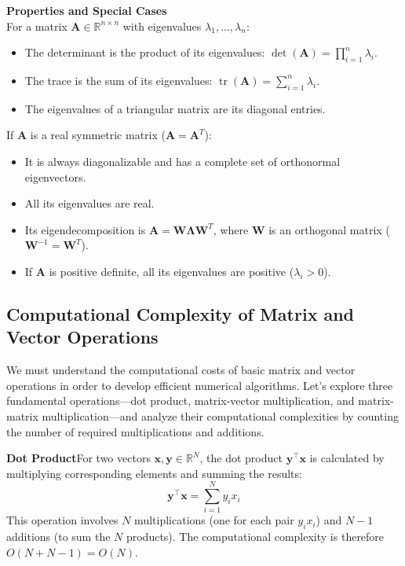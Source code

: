 \begin{theoremBox}
    \textbf{Properties and Special Cases} \\
    For a matrix $\mathbf{A} \in \mathbb{R}^{n \times n}$ with eigenvalues $\lambda_1, \dots, \lambda_n$:
    \begin{itemize}
        \item The determinant is the product of its eigenvalues: $\det(\mathbf{A}) = \prod_{i=1}^n \lambda_i$.
        \item The trace is the sum of its eigenvalues: $\operatorname{tr}(\mathbf{A}) = \sum_{i=1}^n \lambda_i$.
        \item The eigenvalues of a triangular matrix are its diagonal entries.
    \end{itemize}
    If $\mathbf{A}$ is a real symmetric matrix ($\mathbf{A} = \mathbf{A}^T$):
    \begin{itemize}
        \item It is always diagonalizable and has a complete set of orthonormal eigenvectors.
        \item All its eigenvalues are real.
        \item Its eigendecomposition is $\mathbf{A} = \mathbf{W} \mathbf{\Lambda} \mathbf{W}^T$, where $\mathbf{W}$ is an orthogonal matrix ($\mathbf{W}^{-1} = \mathbf{W}^T$).
        \item If $\mathbf{A}$ is positive definite, all its eigenvalues are positive ($\lambda_i > 0$).
    \end{itemize}
\end{theoremBox}


\subsection{Computational Complexity of Matrix and Vector Operations}
\label{sec:complexity-of-matrix-and-vector-operations}
We must understand the computational costs of basic matrix and vector operations in order to develop efficient numerical algorithms. Let's explore three fundamental operations---dot product, matrix-vector multiplication, and matrix-matrix multiplication---and analyze their computational complexities by counting the number of required multiplications and additions.

\textbf{Dot Product}\quad For two vectors $ \mathbf{x}, \mathbf{y} \in \mathbb{R}^N $, the dot product $ \mathbf{y}^\top \mathbf{x} $ is calculated by multiplying corresponding elements and summing the results:
\begin{equation*}
    \mathbf{y}^\top \mathbf{x} = \sum_{i=1}^{N} y_i x_i
\end{equation*}
This operation involves $ N $ multiplications (one for each pair $ y_i x_i $) and $ N - 1 $ additions (to sum the $ N $ products). The computational complexity is therefore $ O(N + N - 1) = O(N) $.

